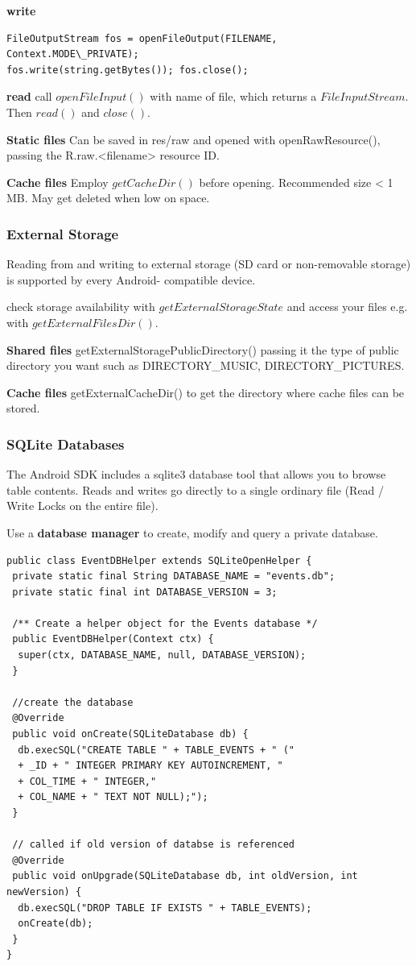 \textbf{write}
\begin{lstlisting}
FileOutputStream fos = openFileOutput(FILENAME, Context.MODE\_PRIVATE);
fos.write(string.getBytes()); fos.close();
\end{lstlisting}

\textbf{read} call $openFileInput()$ with name of file, which returns a
$FileInputStream$. Then $read()$ and $close()$.

\textbf{Static files} Can be saved in res/raw and opened with
openRawResource(), passing the R.raw.<filename> resource ID.

\textbf{Cache files} Employ $getCacheDir()$ before opening. Recommended size <
1 MB. May get deleted when low on space.

\subsubsection{External Storage}
Reading from and writing to external storage (SD card or non-removable storage)
is supported by every Android- compatible device.

check storage availability with $getExternalStorageState$ and access your files
e.g. with $getExternalFilesDir()$.

\textbf{Shared files} getExternalStoragePublicDirectory() passing it the type
of public directory you want such as DIRECTORY\_MUSIC, DIRECTORY\_PICTURES.

\textbf{Cache files} getExternalCacheDir() to get the directory where cache
files can be stored.

\subsubsection{SQLite Databases}
The Android SDK includes a sqlite3 database tool that allows you to browse
table contents. Reads and writes go directly to a single ordinary file (Read /
Write Locks on the entire file).

Use a \textbf{database manager} to create, modify and query a private database.

\begin{lstlisting}
public class EventDBHelper extends SQLiteOpenHelper {
 private static final String DATABASE_NAME = "events.db";
 private static final int DATABASE_VERSION = 3;

 /** Create a helper object for the Events database */
 public EventDBHelper(Context ctx) {
  super(ctx, DATABASE_NAME, null, DATABASE_VERSION);
 }

 //create the database
 @Override
 public void onCreate(SQLiteDatabase db) {
  db.execSQL("CREATE TABLE " + TABLE_EVENTS + " ("
  + _ID + " INTEGER PRIMARY KEY AUTOINCREMENT, "
  + COL_TIME + " INTEGER,"
  + COL_NAME + " TEXT NOT NULL);");
 }

 // called if old version of databse is referenced
 @Override
 public void onUpgrade(SQLiteDatabase db, int oldVersion, int newVersion) {
  db.execSQL("DROP TABLE IF EXISTS " + TABLE_EVENTS);
  onCreate(db);
 }
}
\end{lstlisting}

